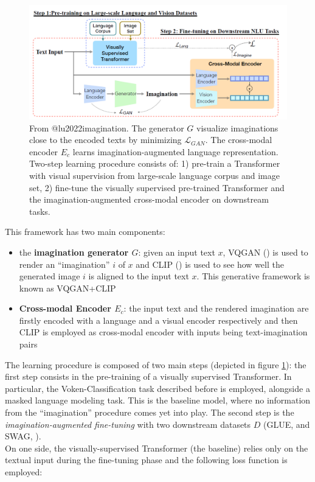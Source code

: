 \documentclass[
]{krantz}
\providecommand{\tightlist}{%
  \setlength{\itemsep}{0pt}\setlength{\parskip}{0pt}}
\begin{document}
\begin{figure}

{\centering \includegraphics[width=1\linewidth]{figures/02-03-img-support-text/img-lu2022-01} 

}

\caption{From @lu2022imagination. The generator $G$ visualize imaginations close to the encoded texts by minimizing $\mathcal{L}_{GAN}$. The cross-modal encoder $E_c$ learns imagination-augmented language representation. Two-step learning procedure consists of: 1) pre-train a Transformer with visual supervision from large-scale language corpus and image set, 2) fine-tune the visually supervised pre-trained Transformer and the imagination-augmented cross-modal encoder on downstream tasks.}\label{fig:img-lu2022-01}
\end{figure}

This framework has two main components:

\begin{itemize}
\tightlist
\item
  the \textbf{imagination generator \(G\)}: given an input text \(x\), VQGAN (\citet{esser2021taming}) is used to render an ``imagination'' \(i\) of \(x\) and CLIP (\citet{radford2021learning}) is used to see how well the generated image \(i\) is aligned to the input text \(x\). This generative framework is known as VQGAN+CLIP
\item
  \textbf{Cross-modal Encoder \(E_c\)}: the input text and the rendered imagination are firstly encoded with a language and a visual encoder respectively and then CLIP is employed as cross-modal encoder with inputs being text-imagination pairs
\end{itemize}

The learning procedure is composed of two main steps (depicted in figure \ref{fig:img-lu2022-01}): the first step consists in the pre-training of a visually supervised Transformer. In particular, the Voken-Classification task described before is employed, alongside a masked language modeling task. This is the baseline model, where no information from the ``imagination'' procedure comes yet into play. The second step is the \emph{imagination-augmented fine-tuning} with two downstream datasets \(D\) (GLUE, \citet{wang2018glue} and SWAG, \citet{zellers2018swag}).\\
On one side, the visually-supervised Transformer (the baseline) relies only on the textual input during the fine-tuning phase and the following loss function is employed:
\end{document}
